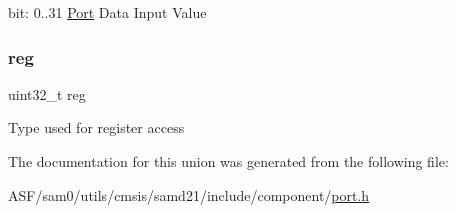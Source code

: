 bit\+: 0..31 \mbox{\hyperlink{struct_port}{Port}} Data Input Value \mbox{\label{union_p_o_r_t___i_n___type_a6b91636401516a477989a336376d7b40}} 
\subsubsection{\texorpdfstring{reg}{reg}}
{\footnotesize\ttfamily uint32\+\_\+t reg}

Type used for register access 

The documentation for this union was generated from the following file\+:\begin{DoxyCompactItemize}
\item 
A\+S\+F/sam0/utils/cmsis/samd21/include/component/\mbox{\hyperlink{utils_2cmsis_2samd21_2include_2component_2port_8h}{port.\+h}}\end{DoxyCompactItemize}
